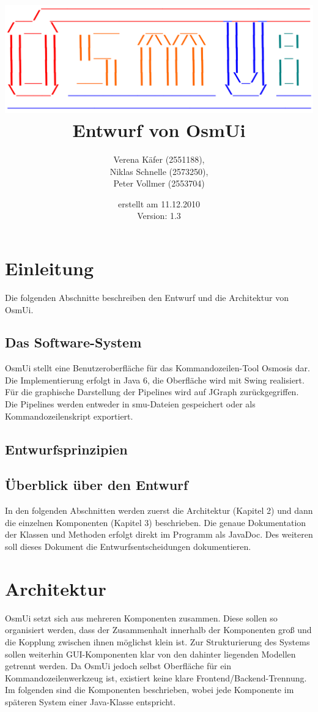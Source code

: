 \documentclass[a4paper,12pt]{scrartcl}
\author{
Verena Käfer (2551188),\\
Niklas Schnelle (2573250),\\
Peter Vollmer (2553704)}
\date{erstellt am 11.12.2010\\
Version: 1.3}
\title{\includegraphics[width=15cm]{../projektplan/Logo_Osmui.png} \\ 
Entwurf von OsmUi}
\begin{document}
\maketitle
\newpage
\tableofcontents
\newpage

\section{Einleitung}
Die folgenden Abschnitte beschreiben den Entwurf und die Architektur von OsmUi.
\subsection{Das Software-System}
OsmUi stellt eine Benutzeroberfläche für das Kommandozeilen-Tool Osmosis dar. Die Implementierung erfolgt in Java 6, die Oberfläche wird mit Swing realisiert. Für die graphische Darstellung der Pipelines wird auf JGraph zurückgegriffen. Die Pipelines werden entweder in smu-Dateien gespeichert oder als Kommandozeilenskript exportiert.
\subsection{Entwurfsprinzipien}

\subsection{Überblick über den Entwurf}
In den folgenden Abschnitten werden zuerst die Architektur (Kapitel 2) und dann die einzelnen Komponenten (Kapitel 3) beschrieben. Die genaue Dokumentation der Klassen und Methoden erfolgt direkt im Programm als JavaDoc. Des weiteren soll dieses Dokument die Entwurfsentscheidungen dokumentieren.

\section{Architektur}
OsmUi setzt sich aus mehreren Komponenten zusammen. Diese sollen so organisiert werden, dass der Zusammenhalt innerhalb der Komponenten groß und die Kopplung zwischen ihnen möglichst klein ist. Zur Strukturierung des Systems sollen weiterhin GUI-Komponenten klar von den dahinter liegenden Modellen getrennt werden. Da OsmUi jedoch selbst Oberfläche für ein Kommandozeilenwerkzeug ist, existiert keine klare Frontend/Backend-Trennung.\\
Im folgenden sind die Komponenten beschrieben, wobei jede Komponente im späteren System einer Java-Klasse entspricht.
\end{document}

